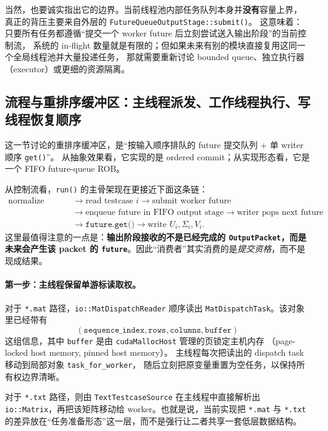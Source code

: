 当然，也要诚实指出它的边界。当前线程池内部任务队列本身并\textbf{没有}容量上界，
真正的背压主要来自外层的 \texttt{FutureQueueOutputStage::submit()}。
这意味着：只要所有任务都遵循“提交一个 worker future 后立刻尝试送入输出阶段”的当前控制流，
系统的 in-flight 数量就是有限的；但如果未来有别的模块直接复用这同一个全局线程池并大量投递任务，
那就需要重新讨论 bounded queue、独立执行器（executor）或更细的资源隔离。

\subsection{流程与重排序缓冲区：主线程派发、工作线程执行、写线程恢复顺序}

这一节讨论的重排序缓冲区，是“按输入顺序排队的 future 提交队列 + 单 writer 顺序 \texttt{get()}”。
从抽象效果看，它实现的是 ordered commit；从实现形态看，它是一个 FIFO future-queue ROB。

从控制流看，\texttt{run()} 的主骨架现在更接近下面这条链：
\[
    \begin{aligned}
        \text{normalize config}
         & \longrightarrow
        \text{read testcase } i
        \longrightarrow
        \text{submit worker future}    \\
         & \longrightarrow
        \text{enqueue future in FIFO output stage}
        \longrightarrow
        \text{writer pops next future} \\
         & \longrightarrow
        \texttt{future.get()}
        \longrightarrow
        \text{write } U_i,\Sigma_i,V_i.
    \end{aligned}
\]
这里最值得注意的一点是：\textbf{输出阶段接收的不是已经完成的 \texttt{OutputPacket}，而是
    未来会产生该 packet 的 \texttt{future}}。因此“消费者”其实消费的是\emph{提交资格}，而不是现成结果。

\paragraph{第一步：主线程保留单游标读取权。}
对于 \texttt{*.mat} 路径，\texttt{io::MatDispatchReader} 顺序读出
\texttt{MatDispatchTask}。该对象里已经带有
\[
    (\texttt{sequence\_index},\texttt{rows},\texttt{columns},\texttt{buffer})
\]
这组信息，其中 \texttt{buffer} 是由 \texttt{cudaMallocHost} 管理的页锁定主机内存
（page-locked host memory, pinned host memory）。
主线程每次把读出的 dispatch task 移动到局部对象 \texttt{task\_for\_worker}，
随后立刻把原变量重置为空任务，以保持所有权边界清晰。

对于 \texttt{*.txt} 路径，则由 \texttt{TextTestcaseSource} 在主线程中直接解析出
\texttt{io::Matrix}，再把该矩阵移动给 worker。也就是说，当前实现把
\texttt{*.mat} 与 \texttt{*.txt} 的差异放在“任务准备形态”这一层，而不是强行让二者共享一套低层数据结构。

